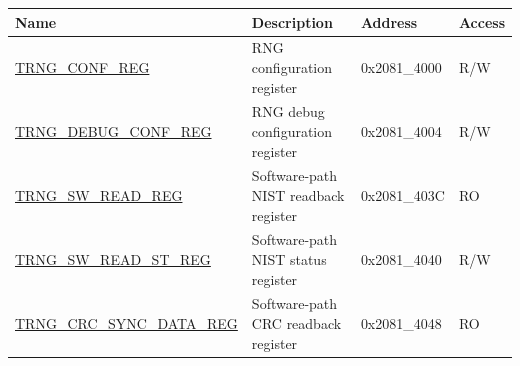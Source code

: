 \begin{longtable}{ | p{5.5cm} | p{6cm} | p{2.5cm} | p{0.8cm} | }
    \hline\rowcolor{lightgray}
    \textbf{Name} & \textbf{Description} & \textbf{Address} & \textbf{Access} \\ \hline
    \endhead
    \hyperref[regdesc:TRNGCONFREG]{TRNG\_CONF\_REG} & RNG configuration register & 0x2081\_4000 & R/W \\ \hline
    \hyperref[regdesc:TRNGDEBUGCONFREG]{TRNG\_DEBUG\_CONF\_REG} & RNG debug configuration register & 0x2081\_4004 & R/W \\ \hline
    \hyperref[regdesc:TRNGSWREADREG]{TRNG\_SW\_READ\_REG} & Software-path NIST readback register & 0x2081\_403C & RO \\ \hline
    \hyperref[regdesc:TRNGSWREADSTREG]{TRNG\_SW\_READ\_ST\_REG} & Software-path NIST status register & 0x2081\_4040 & R/W \\ \hline
    \hyperref[regdesc:TRNGCRCSYNCDATAREG]{TRNG\_CRC\_SYNC\_DATA\_REG} & Software-path CRC readback register & 0x2081\_4048 & RO \\ \hline
\end{longtable}
